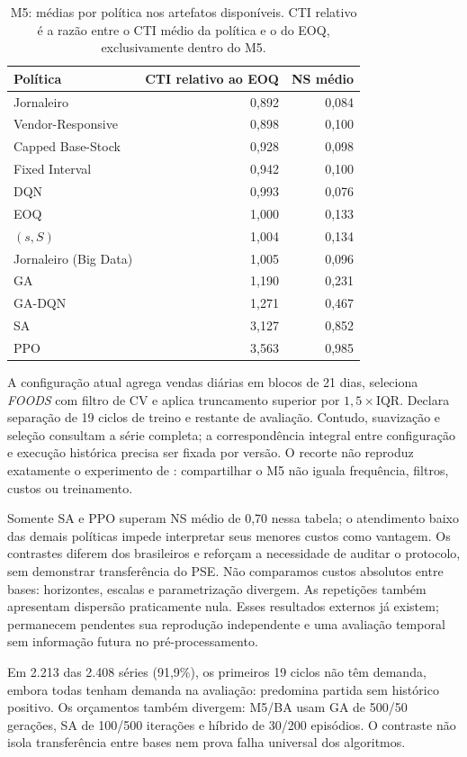 \begin{table}[ht]
\centering\small
\caption{M5: médias por política nos artefatos disponíveis. CTI relativo é a razão entre o CTI médio da política e o do EOQ, exclusivamente dentro do M5.}
\label{tab:m5_sintese}
\begin{tabular}{@{}lrr@{}}
\toprule
Política & CTI relativo ao EOQ & NS médio\\
\midrule
Jornaleiro &0,892&0,084\\
Vendor-Responsive &0,898&0,100\\
Capped Base-Stock &0,928&0,098\\
Fixed Interval &0,942&0,100\\
DQN &0,993&0,076\\
EOQ &1,000&0,133\\
$(s,S)$ &1,004&0,134\\
Jornaleiro (Big Data) &1,005&0,096\\
GA &1,190&0,231\\
GA-DQN &1,271&0,467\\
SA &3,127&0,852\\
PPO &3,563&0,985\\
\bottomrule
\end{tabular}
\end{table}

A configuração atual agrega vendas diárias em blocos de 21 dias, seleciona \textit{FOODS} com filtro de CV e aplica truncamento superior por $1{,}5\times\mathrm{IQR}$. Declara separação de 19 ciclos de treino e restante de avaliação. Contudo, suavização e seleção consultam a série completa; a correspondência integral entre configuração e execução histórica precisa ser fixada por versão. O recorte não reproduz exatamente o experimento de \citet{Zabraoui2025GaDQN}: compartilhar o M5 não iguala frequência, filtros, custos ou treinamento.

Somente SA e PPO superam NS médio de 0,70 nessa tabela; o atendimento baixo das demais políticas impede interpretar seus menores custos como vantagem. Os contrastes diferem dos brasileiros e reforçam a necessidade de auditar o protocolo, sem demonstrar transferência do PSE. Não comparamos custos absolutos entre bases: horizontes, escalas e parametrização divergem. As repetições também apresentam dispersão praticamente nula. Esses resultados externos já existem; permanecem pendentes sua reprodução independente e uma avaliação temporal sem informação futura no pré-processamento.

Em 2.213 das 2.408 séries (91,9\%), os primeiros 19 ciclos não têm demanda, embora todas tenham demanda na avaliação: predomina partida sem histórico positivo. Os orçamentos também divergem: M5/BA usam GA de 500/50 gerações, SA de 100/500 iterações e híbrido de 30/200 episódios. O contraste não isola transferência entre bases nem prova falha universal dos algoritmos.

